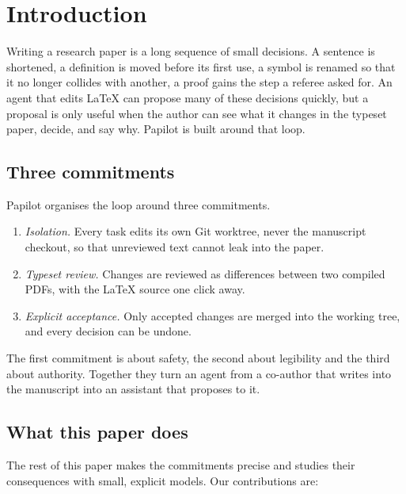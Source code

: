 \section{Introduction}
\label{sec:introduction}

Writing a research paper is a long sequence of small decisions. A sentence is
shortened, a definition is moved before its first use, a symbol is renamed so
that it no longer collides with another, a proof gains the step a referee
asked for. An agent that edits \LaTeX{} can propose many of these decisions
quickly, but a proposal is only useful when the author can see what it changes
in the typeset paper, decide, and say why. Papilot is built around that loop.

\subsection{Three commitments}

Papilot organises the loop around three commitments.

\begin{enumerate}[label=(C\arabic*)]
  \item \emph{Isolation.} Every task edits its own Git worktree, never the
    manuscript checkout, so that unreviewed text cannot leak into the paper.
  \item \emph{Typeset review.} Changes are reviewed as differences between two
    compiled PDFs, with the \LaTeX{} source one click away.
  \item \emph{Explicit acceptance.} Only accepted changes are merged into the
    working tree, and every decision can be undone.
\end{enumerate}

The first commitment is about safety, the second about legibility and the
third about authority. Together they turn an agent from a co-author that writes
into the manuscript into an assistant that proposes to it.

\subsection{What this paper does}

The rest of this paper makes the commitments precise and studies their
consequences with small, explicit models. Our contributions are:

